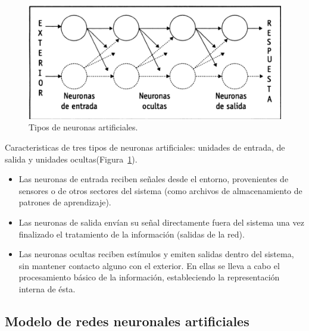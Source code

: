 \begin{figure}[H]
  \begin{center}
    \includegraphics[scale=0.90]{./tipo_neuronas.png}
    \caption{Tipos de neuronas artificiales\cite{lopez2008redes}.}
    \label{fig:tipo}
  \end{center}
\end{figure}

Caracteristicas de tres tipos de neuronas artificiales:
unidades de entrada, de salida y unidades ocultas(Figura~\ref{fig:tipo})\cite{lopez2008redes}.

\begin{itemize}
\item  Las neuronas de entrada reciben señales desde el entorno, provenientes de sensores o de otros sectores del sistema (como archivos de almacenamiento de patrones de aprendizaje).

\item Las neuronas de salida envían su señal directamente fuera del sistema una vez finalizado el tratamiento de la información (salidas de la red).

\item Las neuronas ocultas reciben estímulos y emiten salidas dentro del sistema, sin mantener contacto alguno con el exterior. En ellas se lleva a cabo el procesamiento básico de la información, estableciendo la representación
interna de ésta.
\end{itemize}

\subsection{Modelo de redes neuronales artificiales}

